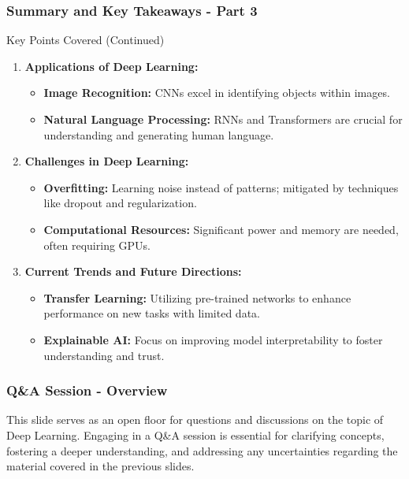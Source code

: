 \documentclass[aspectratio=169]{beamer}
\begin{document}
\begin{frame}[fragile]
    \frametitle{Summary and Key Takeaways - Part 3}
    \begin{block}{Key Points Covered (Continued)}
        \begin{enumerate}[resume]
            \item \textbf{Applications of Deep Learning:}
                \begin{itemize}
                    \item \textbf{Image Recognition:} CNNs excel in identifying objects within images.
                    \item \textbf{Natural Language Processing:} RNNs and Transformers are crucial for understanding and generating human language.
                \end{itemize}

            \item \textbf{Challenges in Deep Learning:}
                \begin{itemize}
                    \item \textbf{Overfitting:} Learning noise instead of patterns; mitigated by techniques like dropout and regularization.
                    \item \textbf{Computational Resources:} Significant power and memory are needed, often requiring GPUs.
                \end{itemize}

            \item \textbf{Current Trends and Future Directions:}
                \begin{itemize}
                    \item \textbf{Transfer Learning:} Utilizing pre-trained networks to enhance performance on new tasks with limited data.
                    \item \textbf{Explainable AI:} Focus on improving model interpretability to foster understanding and trust.
                \end{itemize}
        \end{enumerate}
    \end{block}
\end{frame}

\begin{frame}[fragile]
    \frametitle{Q\&A Session - Overview}
    This slide serves as an open floor for questions and discussions on the topic of Deep Learning. 
    Engaging in a Q\&A session is essential for clarifying concepts, fostering a deeper understanding, 
    and addressing any uncertainties regarding the material covered in the previous slides.
\end{frame}
\end{document}
